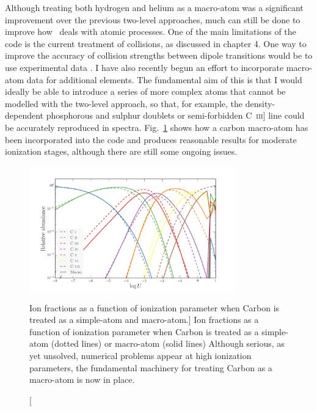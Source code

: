 Although treating both hydrogen and helium as a macro-atom was
a significant improvement over the previous two-level approaches, 
much can still be done to improve how \py\ deals with atomic processes.
One of the main limitations of the code is the current treatment of
collisions, as discussed in chapter 4. One way to improve the accuracy
of collision strengths between dipole transitions would be to use
experimental data \citep[e.g.][]{gaetz1983}. 
I have also recently begun an effort to incorporate macro-atom data for
additional elements. The fundamental aim of this is that I would ideally
be able to introduce a series of more complex atoms that cannot be modelled 
with the two-level approach, so that, for example, the density-dependent 
phosphorous and sulphur doublets or semi-forbidden C~\textsc{iii}] 
line could be accurately reproduced in spectra. 
Fig.~\ref{fig:carbon_matom} shows how a carbon macro-atom
has been incorporated into the code and produces reasonable results for moderate
ionization stages, although there are still some ongoing issues.

\begin{figure} 
\centering
\includegraphics[width=0.8\textwidth]{figures/ewpaper/carbon_matom_ion.png}
\caption
[Ion fractions as a function of ionization parameter when 
Carbon is treated as a simple-atom and macro-atom.]
{
Ion fractions as a function of ionization parameter when 
Carbon is treated as a simple-atom (dotted lines) or macro-atom (solid lines)
Although serious, as yet unsolved, numerical problems appear at 
high ionization parameters, the fundamental machinery for treating
Carbon as a macro-atom is now in place.
}
\label{fig:carbon_matom}
\end{figure} 


